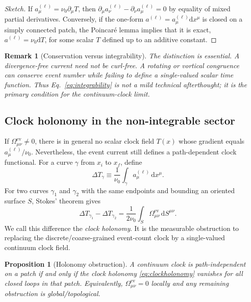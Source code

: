 \documentclass[pdflatex,sn-mathphys-num]{sn-jnl}
\theoremstyle{thmstylethree}
\theoremstyle{thmstyleone}
\newtheorem{proposition}{Proposition}[section]
\theoremstyle{thmstyletwo}
\newtheorem{remark}{Remark}[section]
\numberwithin{equation}{section}
\newcommand{\dd}{\mathrm{d}}
\begin{document}
    \begin{proof}[Sketch]
        If $a^{(\ell)}_\mu=\nu_0\partial_\mu T$, then $\partial_\mu a^{(\ell)}_\nu-\partial_\nu a^{(\ell)}_\mu=0$ by equality of mixed partial derivatives. Conversely, if the one-form $a^{(\ell)}=a^{(\ell)}_\mu\dd x^\mu$ is closed on a simply connected patch, the Poincar\'e lemma implies that it is exact, $a^{(\ell)}=\nu_0\dd T$, for some scalar $T$ defined up to an additive constant.
    \end{proof}
    
    \begin{remark}[Conservation versus integrability]
        The distinction is essential. A divergence-free current need not be curl-free. A rotating or vortical congruence can conserve event number while failing to define a single-valued scalar time function. Thus Eq.~\eqref{eq:integrability} is not a mild technical afterthought; it is the primary condition for the continuum-clock limit.
    \end{remark}
    
    \subsection{Clock holonomy in the non-integrable sector}
    
    If $\Omega^{\mathrm{ev}}_{\mu\nu}\neq0$, there is in general no scalar clock field $T(x)$ whose gradient equals $a^{(\ell)}_\mu/\nu_0$. Nevertheless, the event current still defines a path-dependent clock functional. For a curve $\gamma$ from $x_i$ to $x_f$, define
    \begin{equation}
        \Delta T_\gamma
        \equiv
        \frac{1}{\nu_0}\int_\gamma a^{(\ell)}_\mu\,\dd x^\mu .
        \label{eq:pathclock}
    \end{equation}
    For two curves $\gamma_1$ and $\gamma_2$ with the same endpoints and bounding an oriented surface $S$, Stokes' theorem gives
    \begin{equation}
        \Delta T_{\gamma_1}-\Delta T_{\gamma_2}
        =
        \frac{1}{2\nu_0}
        \int_S
        \Omega^{\mathrm{ev}}_{\mu\nu}\,\dd S^{\mu\nu} .
        \label{eq:clockholonomy}
    \end{equation}
    We call this difference the \emph{clock holonomy}. It is the measurable obstruction to replacing the discrete/coarse-grained event-count clock by a single-valued continuum clock field.
    
    \begin{proposition}[Holonomy obstruction]
        A continuum clock is path-independent on a patch if and only if the clock holonomy \eqref{eq:clockholonomy} vanishes for all closed loops in that patch. Equivalently, $\Omega^{\mathrm{ev}}_{\mu\nu}=0$ locally and any remaining obstruction is global/topological.
    \end{proposition}
    
\end{document}
